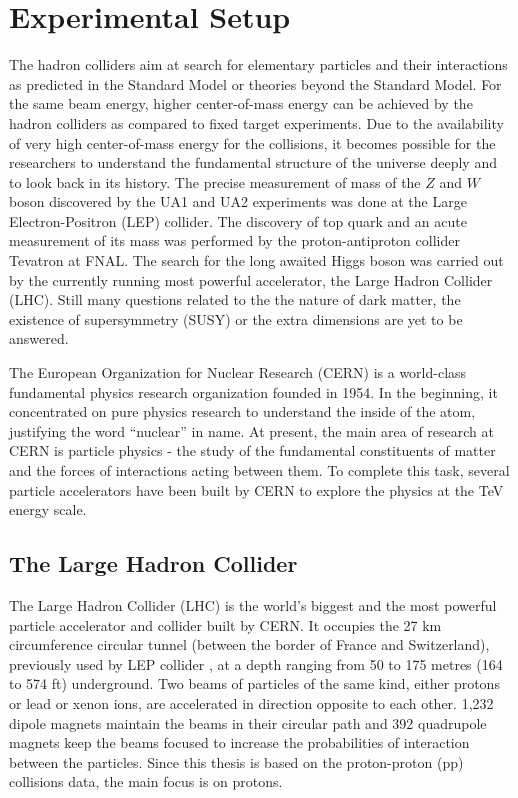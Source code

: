 \chapter{Experimental Setup}
\label{chap:Detector}
The hadron colliders aim at search for elementary particles and their interactions as predicted in the Standard Model or theories beyond the Standard Model. For the same beam energy, higher center-of-mass energy can be achieved by the hadron colliders as compared to fixed target experiments. Due to the availability of very high center-of-mass energy for the collisions, it becomes possible for the researchers to understand the fundamental structure of the universe deeply and to look back in its history. The precise measurement of mass of the $Z$ and $W$ boson discovered by the UA1 and UA2 experiments was done at the Large Electron-Positron (LEP) collider. The discovery of top quark and an acute measurement of its mass was performed by the proton-antiproton collider Tevatron at FNAL. The search for the long awaited Higgs boson was carried out by the currently running most powerful accelerator, the Large Hadron Collider (LHC). Still many questions related to the the nature of dark matter, the existence of supersymmetry (SUSY) or the extra dimensions are yet to be answered. 

The European Organization for Nuclear Research (CERN) is a world-class fundamental physics research organization founded in 1954. In the beginning, it concentrated on pure physics research to understand the inside of the atom, justifying the word ``nuclear'' in name. At present, the main area of research at CERN is particle physics - the study of the fundamental constituents of matter and the forces of interactions acting between them. To complete this task, several particle accelerators have been built by CERN to explore the physics at the TeV energy scale.

\section{The Large Hadron Collider}
The Large Hadron Collider (LHC) \cite{Evans:2008zzb} is the world's biggest and the most powerful particle accelerator and collider built by CERN. It occupies the 27 km circumference circular tunnel (between the border of France and Switzerland), previously used by LEP collider \cite{LEP}, at a depth ranging from 50 to 175 metres (164 to 574 ft) underground. Two beams of particles of the same kind, either protons or lead or xenon ions, are accelerated in direction opposite to each other. 1,232 dipole magnets maintain the beams in their circular path and 392 quadrupole magnets keep the beams focused to increase the probabilities of interaction between the particles. Since this thesis is based on the proton-proton (pp) collisions data, the main focus is on protons. 

